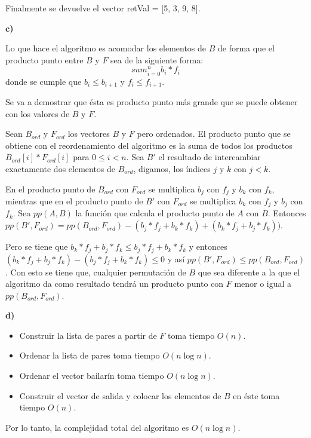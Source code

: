 \documentclass{article}
\begin{document}
Finalmente se devuelve el vector retVal = [5, 3, 9, 8].

\textbf{c)}

Lo que hace el algoritmo es acomodar los elementos de $B$ de forma que el producto punto entre $B$ y $F$ sea de la siguiente forma: \[sum_{i=0}^{n} b_i*f_i\] donde se cumple que $b_i \leq b_{i+1}$ y $f_i \leq f_{i+1}$.

Se va a demostrar que ésta es producto punto más grande que se puede obtener con los valores de $B$ y $F$.

Sean $B_{ord}$ y $F_{ord}$ los vectores $B$ y $F$ pero ordenados. El producto punto que se obtiene con el reordenamiento del algoritmo es la suma de todos los productos $B_{ord}[i]*F_{ord}[i]$ para $0 \leq i < n$. Sea $B'$ el resultado de intercambiar exactamente dos elementos de $B_{ord}$, digamos, los índices $j$ y $k$ con $j<k$.

En el producto punto de $B_{ord}$ con $F_{ord}$ se multiplica $b_j$ con $f_j$ y $b_k$ con $f_k$, mientras que en el producto punto de $B'$ con $F_{ord}$ se multiplica $b_k$ con $f_j$ y $b_j$ con $f_k$. Sea $pp(A, B)$ la función que calcula el producto punto de $A$ con $B$. Entonces $pp(B', F_{ord}) = pp(B_{ord}, F_{ord}) - (b_j*f_j + b_k*f_k) + (b_k*f_j + b_j*f_k))$.

Pero se tiene que $b_k*f_j + b_j*f_k \leq b_j*f_j + b_k*f_k$ y entonces $(b_k*f_j + b_j*f_k) - (b_j*f_j + b_k*f_k) \leq 0$ y así $pp(B', F_{ord}) \leq pp(B_{ord}, F_{ord})$. Con esto se tiene que, cualquier permutación de $B$ que sea diferente a la que el algoritmo da como resultado tendrá un producto punto con $F$ menor o igual a $pp(B_{ord}, F_{ord})$.

\textbf{d)}

\begin{itemize}
\item Construir la lista de pares a partir de $F$ toma tiempo $O(n)$.
\item Ordenar la lista de pares toma tiempo $O(n \log n)$.
\item Ordenar el vector bailarín toma tiempo $O(n \log n)$.
\item Construir el vector de salida y colocar los elementos de $B$ en éste toma tiempo $O(n)$.
\end{itemize}

Por lo tanto, la complejidad total del algoritmo es $O(n \log n)$.
\end{document}
